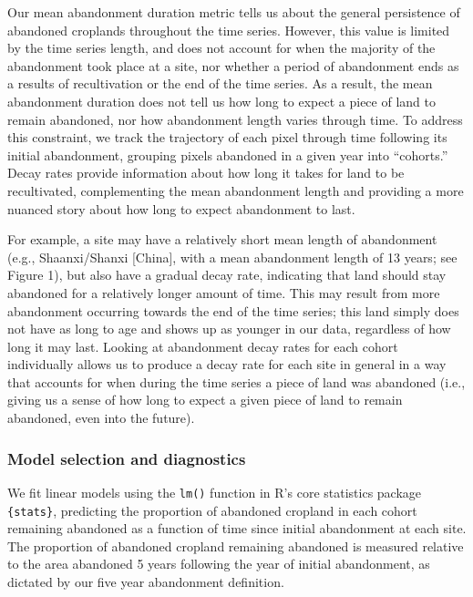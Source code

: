 \documentclass[9pt,lineno]{pnas-new}
\begin{document}
Our mean abandonment duration metric tells us about the general persistence of abandoned croplands throughout the time series.
However, this value is limited by the time series length, and does not account for when the majority of the abandonment took place at a site, nor whether a period of abandonment ends as a results of recultivation or the end of the time series.
As a result, the mean abandonment duration does not tell us how long to expect a piece of land to remain abandoned, nor how abandonment length varies through time.
To address this constraint, we track the trajectory of each pixel through time following its initial abandonment, grouping pixels abandoned in a given year into ``cohorts.'' Decay rates provide information about how long it takes for land to be recultivated, complementing the mean abandonment length and providing a more nuanced story about how long to expect abandonment to last.

For example, a site may have a relatively short mean length of abandonment (e.g., Shaanxi/Shanxi {[}China{]}, with a mean abandonment length of 13 years; see Figure 1), but also have a gradual decay rate, indicating that land should stay abandoned for a relatively longer amount of time.
This may result from more abandonment occurring towards the end of the time series; this land simply does not have as long to age and shows up as younger in our data, regardless of how long it may last.
Looking at abandonment decay rates for each cohort individually allows us to produce a decay rate for each site in general in a way that accounts for when during the time series a piece of land was abandoned (i.e., giving us a sense of how long to expect a given piece of land to remain abandoned, even into the future).

\hypertarget{model-selection-and-diagnostics}{%
\subsubsection{Model selection and diagnostics}\label{model-selection-and-diagnostics}}

We fit linear models using the \texttt{lm()} function in R's core statistics package \texttt{\{stats\}}, predicting the proportion of abandoned cropland in each cohort remaining abandoned as a function of time since initial abandonment at each site.
The proportion of abandoned cropland remaining abandoned is measured relative to the area abandoned 5 years following the year of initial abandonment, as dictated by our five year abandonment definition.
\end{document}
